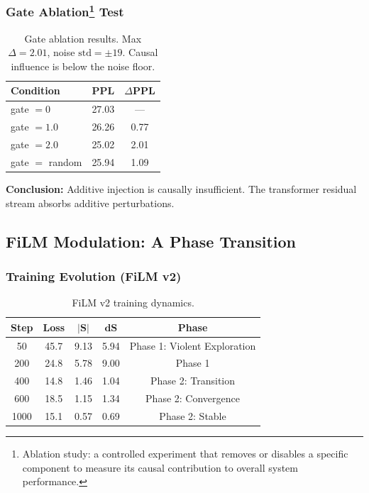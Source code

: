 \documentclass[11pt,a4paper]{article}
\begin{document}
\subsubsection*{Gate Ablation\footnote{Ablation study: a controlled experiment that removes or disables a specific component to measure its causal contribution to overall system performance.} Test}

\begin{table}[h]
\centering
\begin{tabular}{lcc}
\toprule
\textbf{Condition} & \textbf{PPL} & \textbf{$\Delta$PPL} \\
\midrule
gate $= 0$      & 27.03 & ---  \\
gate $= 1.0$    & 26.26 & 0.77 \\
gate $= 2.0$    & 25.02 & 2.01 \\
gate $=$ random & 25.94 & 1.09 \\
\bottomrule
\end{tabular}
\caption{Gate ablation results. Max $\Delta = 2.01$, noise $\mathrm{std} = \pm 19$.
Causal influence is below the noise floor.}
\end{table}

\textbf{Conclusion:} Additive injection is causally insufficient. The transformer
residual stream absorbs additive perturbations.

\subsection{FiLM Modulation: A Phase Transition}

\subsubsection*{Training Evolution (FiLM v2)}

\begin{table}[h]
\centering
\begin{tabular}{ccccc}
\toprule
\textbf{Step} & \textbf{Loss} & $\boldsymbol{|S|}$ & $\boldsymbol{dS}$ & \textbf{Phase} \\
\midrule
  50 & 45.7 & 9.13 & 5.94 & Phase 1: Violent Exploration \\
 200 & 24.8 & 5.78 & 9.00 & Phase 1 \\
 400 & 14.8 & 1.46 & 1.04 & Phase 2: Transition \\
 600 & 18.5 & 1.15 & 1.34 & Phase 2: Convergence \\
1000 & 15.1 & 0.57 & 0.69 & Phase 2: Stable \\
\bottomrule
\end{tabular}
\caption{FiLM v2 training dynamics.}
\end{table}
\end{document}
